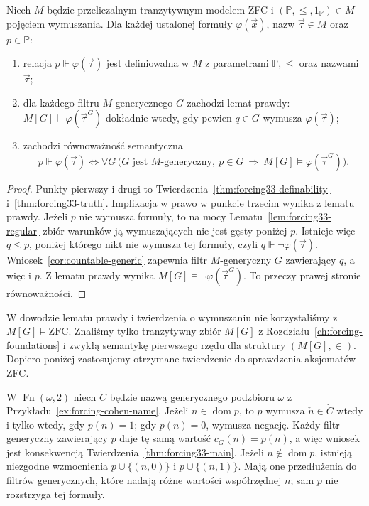 \begin{twierdzenie}
\label{thm:forcing33-main}
Niech $M$ będzie przeliczalnym tranzytywnym
modelem ZFC i
$(\mathbb P,\leq,1_{\mathbb P})\in M$
pojęciem wymuszania. Dla każdej
ustalonej formuły $\varphi(\vec x)$,
nazw $\vec\tau\in M$ oraz $p\in\mathbb P$:
\begin{enumerate}
\item relacja $p\Vdash\varphi(\vec\tau)$
jest definiowalna w $M$
z parametrami $\mathbb P,\leq$
oraz nazwami $\vec\tau$;
\item dla każdego filtru $M$-generycznego $G$
zachodzi lemat prawdy:
$M[G]\models\varphi(\vec\tau^G)$
dokładnie wtedy, gdy pewien $q\in G$
wymusza $\varphi(\vec\tau)$;
\item zachodzi równoważność semantyczna
\[
 p\Vdash\varphi(\vec\tau)
 \iff \forall G\,
 \bigl(G\text{ jest $M$-generyczny},\
 p\in G\ \Longrightarrow\
 M[G]\models\varphi(\vec\tau^G)\bigr).
\]
\end{enumerate}
\end{twierdzenie}
\begin{proof}
Punkty pierwszy i drugi to
Twierdzenia~\ref{thm:forcing33-definability}
i~\ref{thm:forcing33-truth}.
Implikacja w prawo w punkcie trzecim
wynika z lematu prawdy.
Jeżeli $p$ nie wymusza formuły,
to na mocy Lematu~\ref{lem:forcing33-regular}
zbiór warunków ją wymuszających
nie jest gęsty poniżej $p$.
Istnieje więc $q\leq p$, poniżej
którego nikt nie wymusza tej formuły,
czyli $q\Vdash\neg\varphi(\vec\tau)$.
Wniosek~\ref{cor:countable-generic}
zapewnia filtr $M$-generyczny $G$
zawierający $q$, a więc i $p$.
Z lematu prawdy wynika
$M[G]\models\neg\varphi(\vec\tau^G)$.
To przeczy prawej stronie równoważności.
\end{proof}

\begin{uwaga}
\label{rem:forcing33-no-circularity}
W dowodzie lematu prawdy i twierdzenia
o wymuszaniu nie korzystaliśmy z
$M[G]\models\mathrm{ZFC}$.
Znaliśmy tylko tranzytywny
zbiór $M[G]$ z Rozdziału~\ref{ch:forcing-foundations}
i zwykłą semantykę pierwszego rzędu
dla struktury $(M[G],\in)$.
Dopiero poniżej zastosujemy otrzymane
twierdzenie do sprawdzenia aksjomatów ZFC.
\end{uwaga}

\begin{przyklad}
\label{ex:forcing33-cohen-bit}
W $\operatorname{Fn}(\omega,2)$
niech $\dot C$ będzie nazwą
generycznego podzbioru $\omega$
z Przykładu~\ref{ex:forcing-cohen-name}.
Jeżeli $n\in\operatorname{dom}p$,
to $p$ wymusza $\check n\in\dot C$
wtedy i tylko wtedy, gdy $p(n)=1$;
gdy $p(n)=0$, wymusza negację.
Każdy filtr generyczny zawierający $p$
daje tę samą wartość $c_G(n)=p(n)$,
a więc wniosek jest konsekwencją
Twierdzenia~\ref{thm:forcing33-main}.
Jeżeli $n\notin\operatorname{dom}p$,
istnieją niezgodne wzmocnienia
$p\cup\{(n,0)\}$ i $p\cup\{(n,1)\}$.
Mają one przedłużenia do filtrów
generycznych, które nadają
różne wartości współrzędnej $n$;
sam $p$ nie rozstrzyga tej formuły.
\end{przyklad}


